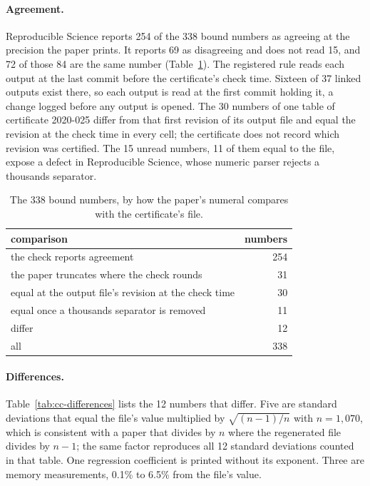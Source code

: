 \paragraph{Agreement.} Reproducible Science reports 254 of the 338 bound numbers as agreeing at the
precision the paper prints. It reports 69 as disagreeing and does not read 15, and 72 of those
84 are the same number (Table~\ref{tab:cc-agreement}). The registered rule reads each output at the last commit before the certificate's check time.
Sixteen of 37 linked outputs exist there, so each output is read at the first commit holding
it, a change logged before any output is opened. The 30 numbers of one table of certificate
2020-025 differ from that first revision of its output file and equal the revision at the check
time in every cell; the certificate does not record which revision was certified. The 15 unread numbers, 11 of them equal to the file, expose a defect in Reproducible Science, whose
numeric parser rejects a thousands separator.

\vspace{0.5em}
\begin{table}[H]
\centering
\small
\caption{The 338 bound numbers, by how the paper's numeral compares with the certificate's
file.}
\label{tab:cc-agreement}
\begin{tabular}{@{}>{\raggedright\arraybackslash}p{}r@{}}
\toprule
comparison & numbers \\
\midrule
the check reports agreement & 254 \\
the paper truncates where the check rounds & 31 \\
equal at the output file's revision at the check time & 30 \\
equal once a thousands separator is removed & 11 \\
differ & 12 \\
\midrule
all & 338 \\
\bottomrule
\end{tabular}
\end{table}

\paragraph{Differences.} Table~\ref{tab:cc-differences} lists the 12 numbers that differ. Five
are standard deviations that equal the file's value multiplied by $\sqrt{(n-1)/n}$ with
$n = 1{,}070$, which is consistent with a paper that divides by $n$ where the regenerated file
divides by $n-1$; the same factor reproduces all 12 standard deviations counted in that table.
One regression coefficient is printed without its exponent. Three are memory measurements, 0.1\%
to 6.5\% from the file's value.

